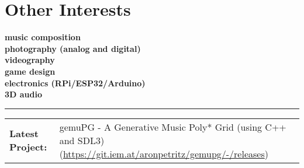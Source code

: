 \documentclass[12pt]{article}
\begin{document}
\vrule
\hfill
\begin{minipage}[t]{.45\textwidth}
	\section*{Other Interests}
	\bf{music composition}\\
	\bf{photography (analog and digital)}\\
	\bf{videography}\\
	\bf{game design}\\
	\bf{electronics (RPi/ESP32/Arduino)}\\
	\bf{3D audio}
\end{minipage}
\vspace{1em}
\hrule
\vspace{0.5em}
\begin{tabular}{p{} p{}}
	\textbf{Latest Project:} & gemuPG - A Generative Music Poly* Grid (using C++ and SDL3)\newline
	(\href{https://git.iem.at/aronpetritz/gemupg/-/releases}{https://git.iem.at/aronpetritz/gemupg/-/releases})
\end{tabular}
\end{document}

